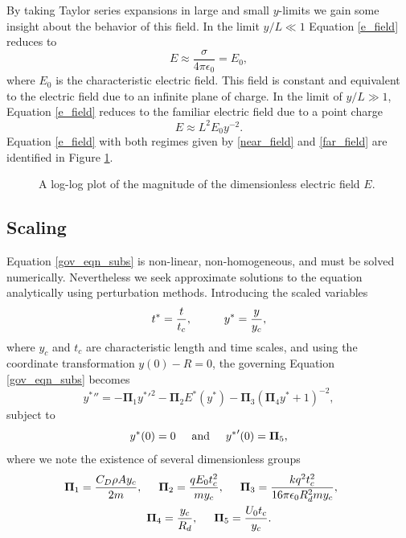 \documentclass[aip,reprint, floatfix]{revtex4-1}
\begin{document}
By taking Taylor series expansions in large and small $y$-limits we gain some insight about the behavior of this field. In the limit $y/L \ll 1$ Equation \ref{e_field} reduces to
\begin{equation}
\label{near_field}
E \approx \frac{\sigma}{4 \pi \epsilon_0} = E_0,
\end{equation}
where $E_0$ is the characteristic electric field. This field is constant and equivalent to the electric field due to an infinite plane of charge. In the limit of $y/L \gg 1$, Equation \ref{e_field} reduces to the familiar electric field due to a point charge
\begin{equation}
\label{far_field}
E \approx L^2 E_0 y^{-2}.
\end{equation}
Equation \ref{e_field} with both regimes given by \ref{near_field} and \ref{far_field} are identified in Figure \ref{fig:E0}.
\begin{figure}[h]
    \centering
    \def\svgwidth{\columnwidth}
    
    \caption{A log-log plot of the magnitude of the dimensionless electric field $E$.\label{fig:E0}}
\end{figure}

\subsection{Scaling}
Equation \ref{gov_eqn_subs} is non-linear, non-homogeneous, and must be solved numerically. Nevertheless we seek approximate solutions to the equation analytically using perturbation methods. Introducing the scaled variables
\begin{equation}
 t^* = \frac{t}{t_c}, \hspace{10 mm} y^* = \frac{y}{y_c}, \end{equation}
where $y_c$ and $t_c$ are characteristic length and time scales, and using the coordinate transformation $y(0) - R = 0$, the governing Equation \ref{gov_eqn_subs} becomes
\begin{equation}
\label{pi_terms}
 {y^*}'' = - \mathbf{\Pi}_1 {y^*}'^2
- \mathbf{\Pi}_2 E^* ( {y^*} ) 
- \mathbf{\Pi}_3 \left( \mathbf{\Pi}_4 {y^*} + 1 \right)^{-2},
\end{equation}
subject to
\begin{equation*}
{y^*}(0) = 0 \hspace{5 mm} \mbox{and} \hspace{5 mm} {y^*}'(0) = \mathbf{\Pi}_5,
\end{equation*}
where we note the existence of several dimensionless groups
\begin{gather*}
\mathbf{\Pi}_1 = \frac{C_D \rho A y_c}{2 m}, \hspace{5 mm}
\mathbf{\Pi}_2 = \frac{q E_0 t_c^2}{m y_c}, \hspace{5 mm}
\mathbf{\Pi}_3 = \frac{k q^2 t_c^2}{16 \pi \epsilon_0 R_d^2 m y_c}, \hspace{5 mm}\\
\mathbf{\Pi}_4 = \frac{y_c}{R_d}, \hspace{5 mm}
\mathbf{\Pi}_5 = \frac{U_0 t_c}{y_c}.
\end{gather*}
\end{document}
